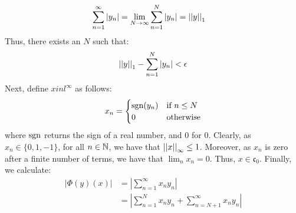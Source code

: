 \documentclass[12pt]{article}
\begin{document}
\begin{solution}
\begin{enumerate}
        \begin{align*}
            \sum_{n=1}^\infty |y_n| &= \lim_{N \to \infty} \sum_{n=1}^N |y_n| = \left\vert\left\vert y\right\vert\right\vert_1
        \end{align*} 
        Thus, there exists an $N$ such that: 
        \[\left\vert\left\vert y\right\vert\right\vert_1 - \sum_{n=1}^N |y_n| < \epsilon\]
        Next, define $x in l^\infty$ as follows: 
        \begin{align*}
            x_n = \begin{cases}
                \operatorname{sgn}(y_n) & \text{if } n \leq N \\
                0 & \text{otherwise} 
            \end{cases}
        \end{align*}
        where $\operatorname{sgn}$ returns the sign of a real number, and $0$ for $0$. \bbni
        Clearly, as $x_n \in \{0, 1, -1\}$, for all $n \in \mathbb N$, we have that $\left\vert\left\vert x\right\vert\right\vert_\infty \leq 1$. Moreover, as $x_n$ is zero after a finite number of terms, we have that $\lim_n x_n = 0$. Thus, $x \in \mathfrak{c}_0$. Finally, we calculate: 
        \begin{align*}
            |\Phi(y)(x)| &= \left|\sum_{n=1}^\infty x_ny_n\right| \\
            &= \left|\sum_{n=1}^N x_ny_n + \sum_{n=N+1}^\infty x_ny_n\right|
        \end{align*}
    \end{enumerate}
\end{solution}
\newpage
\end{document}
